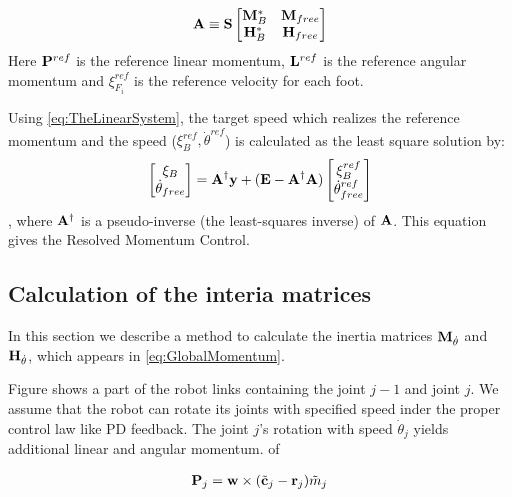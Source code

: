 \begin{equation}
{\bf A} \equiv {\bf S}
\left[
\begin{matrix}
{\bf M}^*_B & {\bf M}_{free}\\
{\bf H}^*_B & {\bf H}_{free}\\
\end{matrix}
\right]
\end{equation}
Here ${\bf P}^{ref}$ is the reference linear momentum,
${\bf L}^{ref}$ is the reference angular momentum and
$\xi^{ref}_{F_i}$ is the reference velocity for each foot.
\par
Using \ref{eq:TheLinearSystem}, the target speed which realizes the
reference momentum and the speed ($\xi^{ref}_B, \dot{\theta}^{ref}$)
is calculated as the least square solution by:
\begin{equation}
\left[
\begin{matrix}
\xi_B \\
\dot{\bf \theta}_{free}
\end{matrix}
\right]
=
{\bf A}^{\dagger}{\bf y}
+ ({\bf E} - {\bf A}^{\dagger}{\bf A})
\left[
\begin{matrix}
\xi_B^{ref} \\
\dot{\bf \theta}_{free}^{ref}\\
\end{matrix}
\right]
\end{equation},
where ${\bf A}^{\dagger}$ is a pseudo-inverse (the least-squares inverse) of
${\bf A}$. This equation gives the Resolved Momentum Control.


\subsection{Calculation of the interia matrices}
In this section we describe a method to calculate the inertia matrices
${\bf M}_{\dot{\theta}}$ and ${\bf H}_{\dot{\theta}}$, which appears
in \ref{eq:GlobalMomentum}.
\par
Figure 
shows a part of the robot links containing the joint $j-1$ and joint $j$.
We assume that the robot can rotate its joints with specified speed inder the 
proper control law like PD feedback. The joint $j$'s rotation with speed
$\dot{\theta}_j$ yields additional linear and angular momentum. of

\begin{equation}
\begin{aligned}
{\bf P}_j &= {\bf w} \times ( \tilde{\bf c}_j - {\bf r}_j ) \tilde{m}_j \\
\end{aligned}
\label{eq:IterativeLinearMomentum}
\end{equation}

